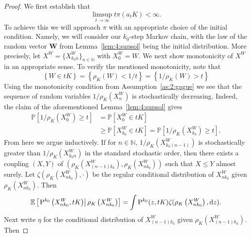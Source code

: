 \documentclass[preprint,12pt]{elsarticle}
\theoremstyle{definition}
\theoremstyle{remark}
\newcommand{\zbf}{{ z}}
\newcommand{\Xbf}{{ X}}
\newcommand{\Wbf}{{ W}}
\newcommand{\1}{{\mathbf 1}}
\numberwithin{equation}{section}
\newcommand{\Ebb}{\mathbb{E}}  %
\newcommand{\Nbb}{\mathbb{N}}
\newcommand{\Pbb}{\mathbb{P}}
\newcommand{\ud}{{\rm d}}
\newcommand{\Prm}{{\rm P}}
\begin{document}
\begin{proof}%
	We first establish that
	\begin{equation}\label{eq:4:Pfpiclaim1}
		\limsup_{t \to \infty} t \pi (a_tK) <\infty.
	\end{equation}
	To achieve this we will approach $\pi$ with an appropriate choice of the initial condition.
	Namely, we will consider our $k_0$-step Markov chain, with the law of the random 
    vector $\mathbf{W}$ from Lemma~\ref{lem:4:supsol} being the initial distribution.
	More precisely, let $\Xbf^\Wbf = \{ \Xbf_{k_0n}^\Wbf \}_{n \in \Nbb}$ with 
    $\Xbf_0^\Wbf = \Wbf$.
	We next show monotonicity of $\Xbf^\Wbf$ in an appropriate sense. 
	To verify the mentioned monotonicity, note that
	\begin{equation*}
		\left\{ \Wbf \in tK \right\} = \left\{ \rho_{K}(\Wbf)< 1/t   \right\} = 
        \left\{ 1/\rho_{K}(\Wbf)> t   \right\}
	\end{equation*}
	Using the monotonicity condition from Assumption~\ref{as:2:gague}
    	we see that the sequence of random variables $1 / \rho_{K}(\Xbf_n^\Wbf)$ 
	is stochastically decreasing. Indeed, the claim of the 
    aforementioned Lemma~\ref{lem:4:supsol}
	gives
	\begin{align*}
		\Pbb\left[ 1 / \rho_{K}\left(\Xbf_0^\Wbf\right) \geq t \right] & =
		\Pbb\left[ \Xbf_0^\Wbf \in tK \right] \\ & \geq 
		\Pbb\left[ \Xbf_{k_0}^\Wbf \in tK \right] =\Pbb\left[ 1 / 
        \rho_{K}\left(\Xbf_{k_0}^\Wbf\right) \geq t \right].
	\end{align*}
	From here we argue inductively. If for $n \in \Nbb$, $1 / \rho_{K}(\Xbf_{k_0(n-1)}^\Wbf)$ is stochastically
    greater than $1 / \rho_{K}(\Xbf_{k_0n}^\Wbf)$ in the standard stochastic order, 
    then there exists a coupling $(X, Y)$ of 
    $(\rho_{K}(\Xbf_{(n-1)k_0}^\Wbf), \rho_{K}(\Xbf_{nk_0}^\Wbf))$ 
    such that $X \leq Y$ almost surely.  
	Let $\zeta( \rho_{K}(\Xbf_{nk_0}^\Wbf), \cdot)$ be the regular conditional distribution
	of $\Xbf_{nk_0}^\Wbf$ given $\rho_{K}(\Xbf_{nk_0}^\Wbf)$. Then
	\begin{equation*}
		\Ebb \left[\left.\Prm^{k_0}\left(\Xbf_{nk_0}^\Wbf, tK\right) \right| 
        \rho_{K}\left(\Xbf_{nk_0}^\Wbf\right)  \right] 
			= \int \Prm^{k_0}(\zbf, tK) \zeta(\rho_{K}\left(\Xbf_{nk_0}^\Wbf\right), \ud \zbf).
	\end{equation*}
	Next write $\eta$ for the conditional distribution of $\Xbf_{(n-1)k_0}^\Wbf$ given 
	$\rho_{K}(\Xbf_{(n-1)k_0}^\Wbf)$. Then

\end{proof}
\end{document}
